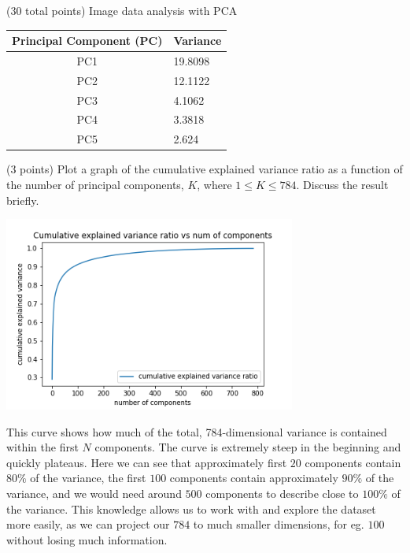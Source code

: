 \documentclass[12pt]{article}
\begin{document}
\begin{question}{(30 total points) Image data analysis with PCA}
\begin{subquestion}
    \begin{answerbox}{15em}
        \centering
        \begin{tabular}{|c|l|}
            \hline
            \multicolumn{1}{|l|}{\textbf{Principal Component (PC)}} & \textbf{Variance} \\ \hline
            PC1                                            & 19.8098  \\ \hline
            PC2                                            & 12.1122  \\ \hline
            PC3                                            & 4.1062   \\ \hline
            PC4                                            & 3.3818   \\ \hline
            PC5                                            & 2.624    \\ \hline
        \end{tabular}
    \end{answerbox}
    


   \end{subquestion}

   \begin{subquestion}{(3 points)
       Plot a graph of the cumulative explained variance ratio as a
       function of the number of principal components, $K$, where $1
       \le K \le 784$.
       Discuss the result briefly.
       } \label{Q1.plot.pca.variance}
   

      \begin{answerbox}{30em}
        \begin{center}
            \includegraphics[width=0.72\textwidth]{results/1_4.png}
        \end{center}
        This curve shows how much of the total, 784-dimensional variance is contained within the first $N$ components. The curve is extremely steep in the beginning and quickly plateaus. Here we can see that approximately first $20$ components contain $80\%$ of the variance, the first $100$ components contain approximately $90\%$ of the variance, and we would need around $500$ components to describe close to $100\%$ of the variance. This knowledge allows us to work with and explore the dataset more easily, as we can project our $784$ to much smaller dimensions, for eg. $100$ without losing much information. 
      \end{answerbox}
  



\end{subquestion}
\end{question}
\end{document}
